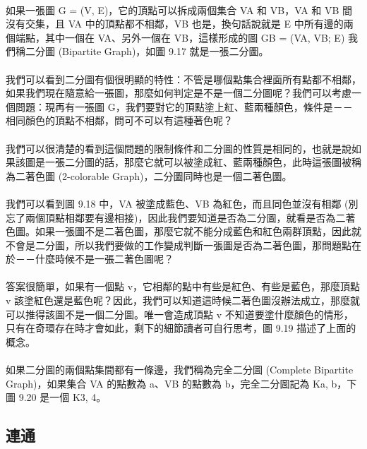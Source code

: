\documentclass[12pt,a4paper,oneside]{report}
\begin{document}
\begin{CJK}{UTF8}{bkai}
\paragraph{}如果一張圖 G = (V, E)，它的頂點可以拆成兩個集合 VA 和 VB，VA 和 VB 間沒有交集，且 VA 中的頂點都不相鄰，VB 也是，換句話說就是 E 中所有邊的兩個端點，其中一個在 VA、另外一個在 VB，這樣形成的圖 GB = (VA, VB; E) 我們稱二分圖 (Bipartite Graph)，如圖 9.17 就是一張二分圖。
\paragraph{}我們可以看到二分圖有個很明顯的特性：不管是哪個點集合裡面所有點都不相鄰，如果我們現在隨意給一張圖，那麼如何判定是不是一個二分圖呢？我們可以考慮一個問題：現再有一張圖 G，我們要對它的頂點塗上紅、藍兩種顏色，條件是－－相同顏色的頂點不相鄰，問可不可以有這種著色呢？
\paragraph{}我們可以很清楚的看到這個問題的限制條件和二分圖的性質是相同的，也就是說如果該圖是一張二分圖的話，那麼它就可以被塗成紅、藍兩種顏色，此時這張圖被稱為二著色圖 (2-colorable Graph)，二分圖同時也是一個二著色圖。
\paragraph{}我們可以看到圖 9.18 中，VA 被塗成藍色、VB 為紅色，而且同色並沒有相鄰 (別忘了兩個頂點相鄰要有邊相接)，因此我們要知道是否為二分圖，就看是否為二著色圖。如果一張圖不是二著色圖，那麼它就不能分成藍色和紅色兩群頂點，因此就不會是二分圖，所以我們要做的工作變成判斷一張圖是否為二著色圖，那問題點在於－－什麼時候不是一張二著色圖呢？
\paragraph{}答案很簡單，如果有一個點 v，它相鄰的點中有些是紅色、有些是藍色，那麼頂點 v 該塗紅色還是藍色呢？因此，我們可以知道這時候二著色圖沒辦法成立，那麼就可以推得該圖不是一個二分圖。唯一會造成頂點 v 不知道要塗什麼顏色的情形，只有在奇環存在時才會如此，剩下的細節讀者可自行思考，圖 9.19 描述了上面的概念。
\paragraph{}如果二分圖的兩個點集間都有一條邊，我們稱為完全二分圖 (Complete Bipartite Graph)，如果集合 VA 的點數為 a、VB 的點數為 b，完全二分圖記為 Ka, b，下圖 9.20 是一個 K3, 4。

\subsection{連通}

\end{CJK}
\end{document}
